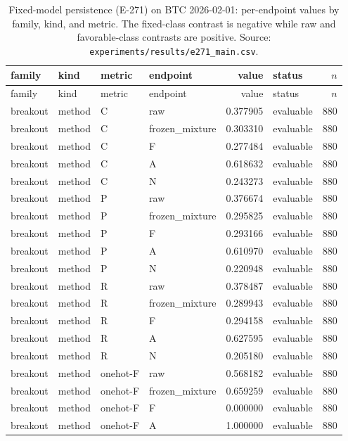 \begin{longtable}{llllrlr}
\caption{Fixed-model persistence (E-271) on BTC 2026-02-01: per-endpoint values by family,
kind, and metric. The fixed-class contrast is negative while raw and favorable-class contrasts
are positive. Source: \texttt{experiments/results/e271\_main.csv}.}
\label{tab:e271}\\
\toprule
family & kind & metric & endpoint & value & status & $n$ \\
\midrule
\endfirsthead
\toprule
family & kind & metric & endpoint & value & status & $n$ \\
\midrule
\endhead
\bottomrule
\endfoot
breakout & method & C & raw & 0.377905 & evaluable & 880 \\
breakout & method & C & frozen\_mixture & 0.303310 & evaluable & 880 \\
breakout & method & C & F & 0.277484 & evaluable & 880 \\
breakout & method & C & A & 0.618632 & evaluable & 880 \\
breakout & method & C & N & 0.243273 & evaluable & 880 \\
breakout & method & P & raw & 0.376674 & evaluable & 880 \\
breakout & method & P & frozen\_mixture & 0.295825 & evaluable & 880 \\
breakout & method & P & F & 0.293166 & evaluable & 880 \\
breakout & method & P & A & 0.610970 & evaluable & 880 \\
breakout & method & P & N & 0.220948 & evaluable & 880 \\
breakout & method & R & raw & 0.378487 & evaluable & 880 \\
breakout & method & R & frozen\_mixture & 0.289943 & evaluable & 880 \\
breakout & method & R & F & 0.294158 & evaluable & 880 \\
breakout & method & R & A & 0.627595 & evaluable & 880 \\
breakout & method & R & N & 0.205180 & evaluable & 880 \\
breakout & method & onehot-F & raw & 0.568182 & evaluable & 880 \\
breakout & method & onehot-F & frozen\_mixture & 0.659259 & evaluable & 880 \\
breakout & method & onehot-F & F & 0.000000 & evaluable & 880 \\
breakout & method & onehot-F & A & 1.000000 & evaluable & 880 \\

\end{longtable}

